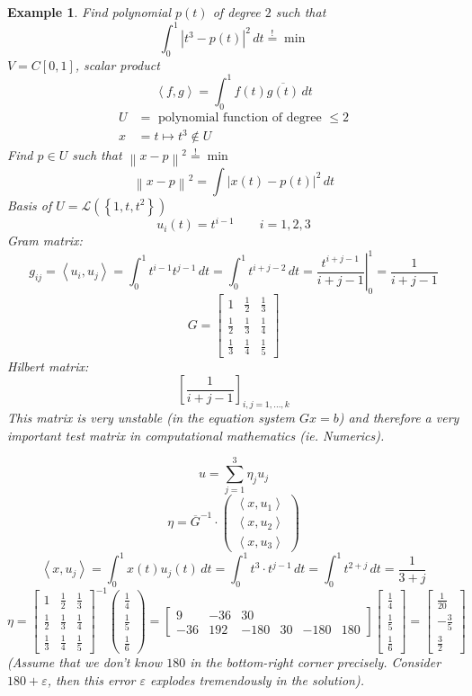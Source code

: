 \documentclass{article}
\newcounter{lecref}[section]
\numberwithin{lecref}{section}
\newtheorem{example}[lecref]{Example}
\newcommand{\set}[1]{\left\{#1\right\}}
\newcommand{\ip}[2]{\left\langle#1,#2\right\rangle} %
\newcommand{\norm}[1]{\left\|#1\right\|}
\newcommand{\card}[1]{\left|#1\right|}
\begin{document}
\begin{example} %
  \label{ex855}
  Find polynomial $p(t)$ of degree $2$ such that
  \[ \int_0^1 \card{t^3 - p(t)}^2 \, dt \overset!= \min \]
  $V = C[0,1]$, scalar product
  \[ \ip{f}{g} = \int_0^1 f(t) \overline{g(t)} \, dt \]
  \begin{align*}
    U &= \text{ polynomial function of degree } \leq 2 \\
    x &= t \mapsto t^3 \not\in U
  \end{align*}
  Find $p \in U$ such that $\norm{x - p}^2 \overset!= \min$
  \[ \norm{x - p}^2 = \int \card{x(t) - p(t)}^2 \, dt \]
  Basis of $U = \mathcal L(\set{1, t, t^2})$
  \[ u_i(t) = t^{i-1} \qquad i = 1,2,3 \]
  Gram matrix:
  \[ g_{ij} = \ip{u_i}{u_j} = \int_0^1 t^{i-1} t^{j-1} \, dt = \int_0^1 t^{i+j-2} \, dt = \left. \frac{t^{i+j-1}}{i + j - 1} \right|_0^1 = \frac{1}{i + j - 1} \]
  \[
    G = \begin{bmatrix}
      1 & \frac12 & \frac13 \\
      \frac12 & \frac13 & \frac14 \\
      \frac13 & \frac14 & \frac15
    \end{bmatrix}
  \]
  Hilbert matrix:
  \[ \left[\frac{1}{i+j-1}\right]_{i,j=1,\ldots,k} \]
  This matrix is very unstable (in the equation system $Gx = b$) and therefore a very important test matrix in computational mathematics (ie. Numerics).

  \[ u = \sum_{j=1}^3 \eta_j u_j \]
  \[ \eta = \overline{G}^{-1} \cdot \begin{pmatrix} \ip{x}{u_1} \\ \ip{x}{u_2} \\ \ip{x}{u_3} \end{pmatrix} \]
  \[ \ip{x}{u_j} = \int_0^1 x(t) u_j(t) \, dt = \int_0^1 t^3 \cdot t^{j-1} \, dt = \int_0^1 t^{2 + j} \, dt = \frac{1}{3 + j} \]
  \[
    \eta = \begin{bmatrix} 1 & \frac12 & \frac13 \\ \frac12 & \frac13 & \frac14 \\ \frac13 & \frac14 & \frac15 \end{bmatrix}^{-1}
    \begin{pmatrix} \frac14 \\ \frac15 \\ \frac16 \end{pmatrix}
    = \begin{bmatrix} 9 & -36 & 30 \\ -36 & 192 & -180 & 30 & -180 & 180 \end{bmatrix}
    \begin{bmatrix} \frac14 \\ \frac15 \\ \frac16 \end{bmatrix}
    = \begin{bmatrix} \frac1{20} \\ -\frac35 \\ \frac32 \end{bmatrix}
  \]
  (Assume that we don't know $180$ in the bottom-right corner precisely. Consider $180+\varepsilon$, then this error $\varepsilon$ explodes tremendously in the solution).
\end{example}
\end{document}
